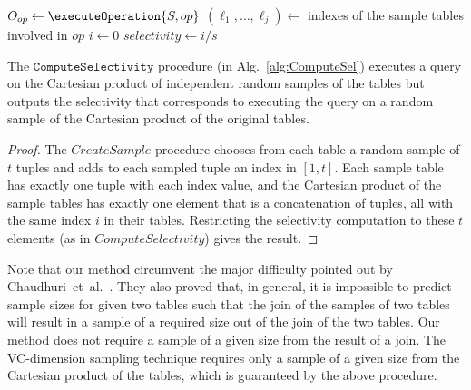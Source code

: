 \begin{algorithm}[ht]
$O_{op} \leftarrow \executeOperation{S, op}$\;
$(\ell_1,\dots,\ell_j)\leftarrow$ indexes of the sample tables involved in $op$ \;
$i\leftarrow 0$\;
$selectivity \leftarrow i/s$\;
\caption{$\mathtt{ComputeSelectivity}(\Sam,op)$}\label{alg:ComputeSel}
\end{algorithm}

\begin{lemma}\label{lem:ComputeSel}
The $\mathtt{ComputeSelectivity}$ procedure (in Alg.~\ref{alg:ComputeSel})
executes a query on the Cartesian product of independent random samples of the
tables but outputs the selectivity that corresponds to executing the query on a
random sample of the Cartesian product of the original tables. 
\end{lemma}

\begin{proof}
The $CreateSample$ procedure chooses from each table a random sample of
$t$ tuples and adds to each sampled tuple an index in $[1,t]$. Each sample table has
exactly one tuple with each index value, and the Cartesian product of the sample
tables has exactly one element that is a concatenation of tuples, all with the
same index $i$ in their tables. Restricting the selectivity computation to these
$t$ elements (as in $ComputeSelectivity$) gives the result. 
\end{proof}

Note that our method circumvent the major difficulty pointed out
by Chaudhuri~et~al.~\citeyearpar{ChaudhuriMN99}. They also proved that, in general, it
is impossible to predict sample sizes for given two tables such that the join of
the samples of two tables will result in a sample of a required size out of the
join of the two tables. Our method does not require a sample of a given size
from the result of a join. The VC-dimension sampling technique requires only a
sample of a given size from the Cartesian product of the tables, which is
guaranteed by the above procedure.


